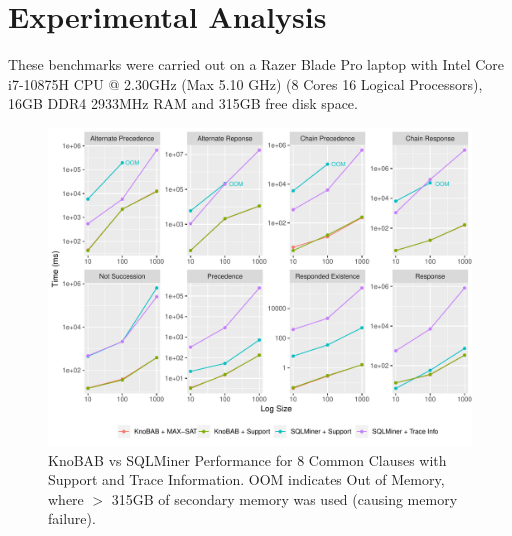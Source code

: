 



\section{Experimental Analysis}\label{sec:exp}
These benchmarks were carried out on a Razer Blade Pro laptop with Intel Core i7-10875H CPU @ 2.30GHz (Max 5.10 GHz) (8 Cores 16 Logical Processors), 16GB DDR4 2933MHz RAM and 315GB free disk space.
\begin{figure}
	\centering
	\includegraphics[width=.8\textwidth]{images/sqlminer_benchmark.pdf}
	\caption{KnoBAB vs SQLMiner Performance for 8 Common Clauses with Support and Trace Information. OOM indicates Out of Memory, where $>$ 315GB of secondary memory was used (causing memory failure).}\label{fig:vsSQL}
\end{figure}

